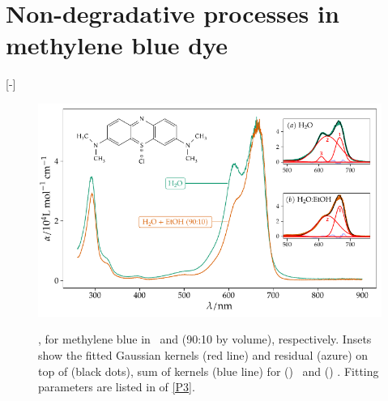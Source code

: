 \documentclass[webedition,openright,titles,swedish,english]{LuaUUThesis}\usepackage[]{graphicx}\usepackage[]{xcolor}
\newenvironment{knitrout}{}{} %
\begin{document}
%

% 

\section{Non-degradative processes in methylene blue dye}
\label{results:P12-methylene-blue}
[-\baselineskip]


%

\begin{figure}[tbp]
\centering
\begin{knitrout}\scriptsize
{}\color{fgcolor}

{\centering \includegraphics[width=4.72in]{figure/0512P-fig-MB-abs-water-ethanol-1} 

}


\end{knitrout}
{\label{fig-a:P12-MB-abs}}
{\label{fig-b:P12-MB-abs}}
\caption[Methylene blue in \water\ and in \water:\EtOH\ solutions]{%
   \protect{}, for methylene blue in \water\ and
    (90:10 by volume), respectively.
   Insets show the fitted Gaussian kernels (red line) and residual (azure) on top of
   \protect{} (black dots), sum of kernels (blue line) for
   () \water\ and
   () .
   Fitting parameters are listed in \supplemental[short] of \protect\cref{P3}.}
\label{fig:P12-MB-abs}
\end{figure}
\end{document}
